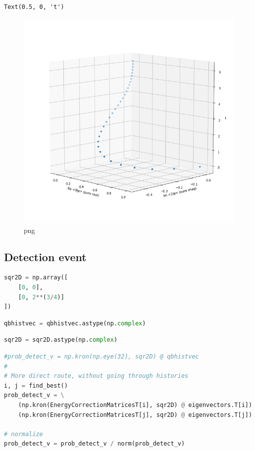 \begin{lstlisting}
Text(0.5, 0, 't')
\end{lstlisting}

\begin{figure}
\centering
\includegraphics[width=0.66\linewidth]{output_85_1.png}
\caption{png}
\end{figure}

\hypertarget{detection-event}{%
\subsection{Detection event}\label{detection-event}}

\begin{lstlisting}[language=Python]
sqr2D = np.array([
    [0, 0],
    [0, 2**(3/4)]
])
\end{lstlisting}

\begin{lstlisting}[language=Python]
qbhistvec = qbhistvec.astype(np.complex)
\end{lstlisting}

\begin{lstlisting}[language=Python]
sqr2D = sqr2D.astype(np.complex)
\end{lstlisting}

\begin{lstlisting}[language=Python]
#prob_detect_v = np.kron(np.eye(32), sqr2D) @ qbhistvec
#
# More direct route, without going through histories
i, j = find_best()
prob_detect_v = \
    (np.kron(EnergyCorrectionMatricesT[i], sqr2D) @ eigenvectors.T[i]) + \
    (np.kron(EnergyCorrectionMatricesT[j], sqr2D) @ eigenvectors.T[j])

# normalize
prob_detect_v = prob_detect_v / norm(prob_detect_v)

\end{lstlisting}

